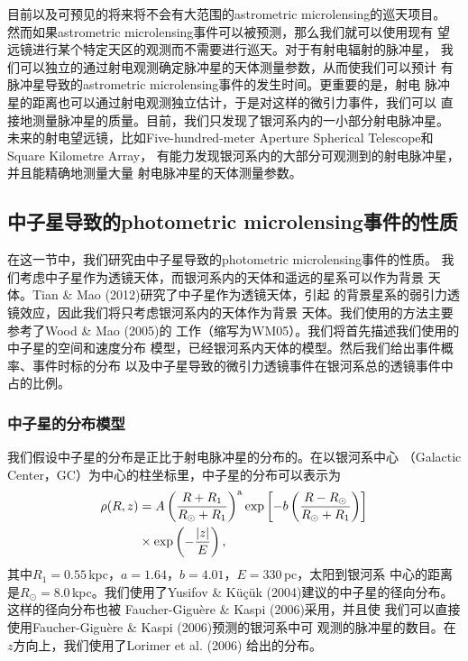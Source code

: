 目前以及可预见的将来将不会有大范围的astrometric microlensing的巡天项目。
然而如果astrometric microlensing事件可以被预测，那么我们就可以使用现有
望远镜进行某个特定天区的观测而不需要进行巡天。对于有射电辐射的脉冲星，
我们可以独立的通过射电观测确定脉冲星的天体测量参数，从而使我们可以预计
有脉冲星导致的astrometric microlensing事件的发生时间。更重要的是，射电
脉冲星的距离也可以通过射电观测独立估计，于是对这样的微引力事件，我们可以
直接地测量脉冲星的质量。目前，我们只发现了银河系内的一小部分射电脉冲星。
未来的射电望远镜，比如Five-hundred-meter Aperture Spherical 
Telescope\supercite{Nan}和Square Kilometre Array\supercite{Johnston2007}，
有能力发现银河系内的大部分可观测到的射电脉冲星，并且能精确地测量大量
射电脉冲星的天体测量参数。

\subsection{中子星导致的photometric microlensing事件的性质}

在这一节中，我们研究由中子星导致的photometric microlensing事件的性质。
我们考虑中子星作为透镜天体，而银河系内的天体和遥远的星系可以作为背景
天体。Tian \& Mao (2012)\supercite{Tian}研究了中子星作为透镜天体，引起
的背景星系的弱引力透镜效应，因此我们将只考虑银河系内的天体作为背景
天体。我们使用的方法主要参考了Wood \& Mao (2005)\supercite{Wood}的
工作（缩写为WM05）。我们将首先描述我们使用的中子星的空间和速度分布
模型，已经银河系内天体的模型。然后我们给出事件概率、事件时标的分布
以及中子星导致的微引力透镜事件在银河系总的透镜事件中占的比例。

\subsubsection{中子星的分布模型}

我们假设中子星的分布是正比于射电脉冲星的分布的。在以银河系中心
（Galactic Center，GC）为中心的柱坐标里，中子星的分布可以表示为
%
\begin{equation}
\begin{split}
\rho(R,z) & =A\left(\frac{R+R_{1}}{R_{\odot}+R_{1}}\right)^{\rm{a}}\exp\left[-b\left(\frac{R-R_{\odot}}{R_{\odot}+R_{1}}\right)\right]\\
          & \times\exp\left(-\frac{|z|}{E}\right),
\end{split}
\end{equation}
%
其中$R_{1}=0.55$\,kpc，$a=1.64$，$b=4.01$，$E=330$\,pc，太阳到银河系
中心的距离是$R_{\odot}=8.0$\,kpc。我们使用了Yusifov \& K{\"u}{\c c}{\"u}k 
(2004)\supercite{Yusifov}建议的中子星的径向分布。这样的径向分布也被
Faucher-Gigu{\`e}re \& Kaspi (2006)\supercite{Faucher}采用，并且使
我们可以直接使用Faucher-Gigu{\`e}re \& Kaspi (2006)预测的银河系中可
观测的脉冲星的数目。在$z$方向上，我们使用了Lorimer et al. (2006)\supercite{Lorimer06}
给出的分布。


